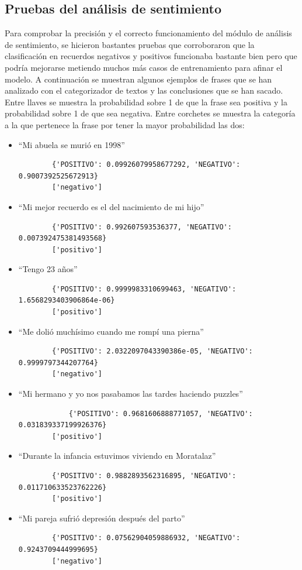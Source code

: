 \subsection{Pruebas del análisis de sentimiento}

Para comprobar la precisión y el correcto funcionamiento del módulo de análisis de sentimiento, se hicieron bastantes pruebas que corroboraron que la clasificación en recuerdos negativos y positivos funcionaba bastante bien pero que podría mejorarse metiendo muchos más casos de entrenamiento para afinar el modelo. A continuación se muestran algunos ejemplos de frases que se han analizado con el categorizador de textos y las conclusiones que se han sacado. Entre llaves se muestra la probabilidad sobre 1 de que la frase sea positiva y la probabilidad sobre 1 de que sea negativa. Entre corchetes se muestra la categoría a la que pertenece la frase por tener la mayor probabilidad las dos:

\begin{itemize}
	\item ``Mi abuela se murió en 1998''
	\begin{verbatim}
		{'POSITIVO': 0.09926079958677292, 'NEGATIVO': 0.9007392525672913}
		['negativo']
	\end{verbatim}
	\item ``Mi mejor recuerdo es el del nacimiento de mi hijo''
	\begin{verbatim}
		{'POSITIVO': 0.992607593536377, 'NEGATIVO': 0.007392475381493568}
		['positivo']
	\end{verbatim}
	\item ``Tengo 23 años''
	\begin{verbatim}
		{'POSITIVO': 0.9999983310699463, 'NEGATIVO': 1.6568293403906864e-06}
		['positivo']
	\end{verbatim}
	\item ``Me dolió muchísimo cuando me rompí una pierna''
	\begin{verbatim}
		{'POSITIVO': 2.0322097043390386e-05, 'NEGATIVO': 0.9999797344207764}
		['negativo']
	\end{verbatim}
	\item ``Mi hermano y yo nos pasabamos las tardes haciendo puzzles''
	\begin{verbatim}
			{'POSITIVO': 0.9681606888771057, 'NEGATIVO': 0.031839337199926376}
		['positivo']
	\end{verbatim}
	\item ``Durante la infancia estuvimos viviendo en Moratalaz''
	\begin{verbatim}
		{'POSITIVO': 0.9882893562316895, 'NEGATIVO': 0.011710633523762226}
		['positivo']
	\end{verbatim}
	\item ``Mi pareja sufrió depresión después del parto''
	\begin{verbatim}
		{'POSITIVO': 0.07562904059886932, 'NEGATIVO': 0.9243709444999695}
		['negativo']
	\end{verbatim}

\end{itemize}


